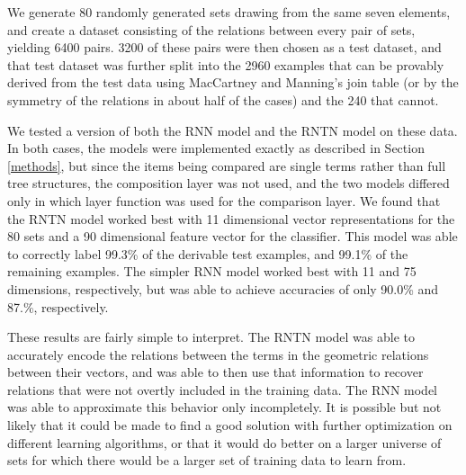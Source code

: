 We generate 80 randomly generated sets drawing from the same seven elements, and create a dataset consisting of the relations between every pair of sets, yielding 6400 pairs. 3200 of these pairs were then chosen as a test dataset, and that test dataset was further split into the 2960 examples that can be provably derived from the test data using MacCartney and Manning's join table (or by the symmetry of the relations in about half of the cases) and the 240 that cannot. %

We tested a version of both the RNN model and the RNTN model on these data. In both cases, the models were implemented exactly as described in Section \ref{methods}, but since the items being compared are single terms rather than full tree structures, the composition layer was not used, and the two models differed only in which layer function was used for the comparison layer.
We found that the RNTN model worked best with 11 dimensional vector representations for the 80 sets and a 90 dimensional feature vector for the classifier. This model was able to correctly label 99.3\% of the derivable test examples, and 99.1\% of the remaining examples. The simpler RNN model worked best with 11 and 75 dimensions, respectively, but was able to achieve accuracies of only 90.0\% and 87.\%, respectively.


These results are fairly simple to interpret. The RNTN model was able to accurately encode the relations between the terms in the geometric relations between their vectors, and was able to then use that information to recover relations that were not overtly included in the training data. The RNN model was able to approximate this behavior only incompletely. It is possible but not likely that it could be made to find a good solution with further optimization on different learning algorithms, or that it would do better on a larger universe of sets for which there would be a larger set of training data to learn from.

